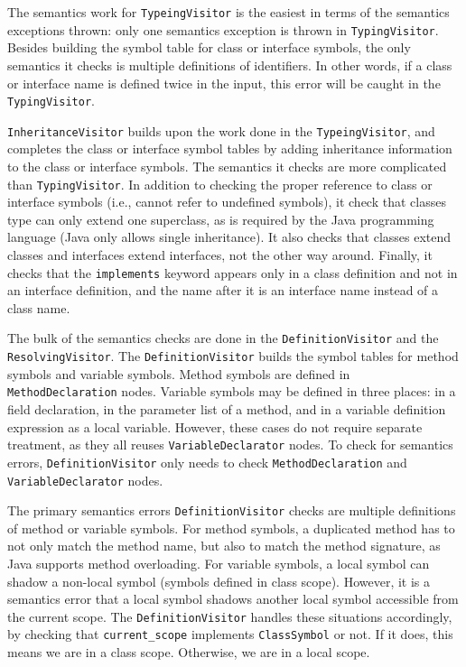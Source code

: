\documentclass[twocolumn]{article}
\begin{document}
The semantics work for \verb|TypeingVisitor| is the easiest in terms of the
semantics exceptions thrown: only one semantics exception is thrown in \verb|TypingVisitor|.
Besides building the symbol table for class or interface symbols, the only
semantics it checks is multiple definitions of identifiers. In other words,
if a class or interface name is defined twice in the input, this error will be
caught in the \verb|TypingVisitor|.

\verb|InheritanceVisitor| builds upon the work done in the \verb|TypeingVisitor|, and
completes the class or interface symbol tables by adding inheritance information
to the class or interface symbols. The semantics it checks are more complicated
than \verb|TypingVisitor|. In addition to checking the proper reference to class or
interface symbols (i.e., cannot refer to undefined symbols), it check that
classes type can only extend one superclass, as is required by the Java programming
language (Java only allows single inheritance). It also checks that classes extend
classes and interfaces extend interfaces, not the other way around. Finally, it
checks that the \verb|implements| keyword appears only in a class definition and not in
an interface definition, and the name after it is an interface name instead of a
class name.

The bulk of the semantics checks are done in the \verb|DefinitionVisitor| and the
\verb|ResolvingVisitor|. The \verb|DefinitionVisitor| builds the symbol tables for
method symbols and variable symbols. Method symbols are defined in \verb|MethodDeclaration|
nodes. Variable symbols may be defined in three places: in a field declaration, in the
parameter list of a method, and in a variable definition expression as a local variable.
However, these cases do not require separate treatment, as they all reuses \verb|VariableDeclarator|
nodes. To check for semantics errors, \verb|DefinitionVisitor| only needs to check
\verb|MethodDeclaration| and \verb|VariableDeclarator| nodes.

The primary semantics errors \verb|DefinitionVisitor| checks are multiple definitions
of method or variable symbols. For method symbols, a duplicated method has to not only
match the method name, but also to match the method signature, as Java supports method
overloading. For variable symbols, a local symbol can shadow a non-local symbol (symbols defined in
class scope). However, it is a semantics error that a local symbol shadows another local symbol accessible from the current scope. The \verb|DefinitionVisitor| handles these situations
accordingly, by checking that \verb|current_scope| implements \verb|ClassSymbol| or not.
If it does, this means we are in a class scope. Otherwise, we are in a local scope.
\end{document}
